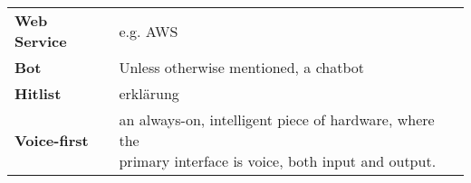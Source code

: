 \begin{flushleft}
\begin{tabular}{ll}


\textbf{Web Service}			&		e.g. AWS\\




\textbf{Bot}				&	Unless otherwise mentioned, a chatbot\\
\textbf{Hitlist}			&	erklärung\\
\textbf{Voice-first}		& \shortstack[l]{an always-on, intelligent piece of hardware, where the \\ primary interface is voice, both input and output.}\\



\end{tabular}
\end{flushleft}
